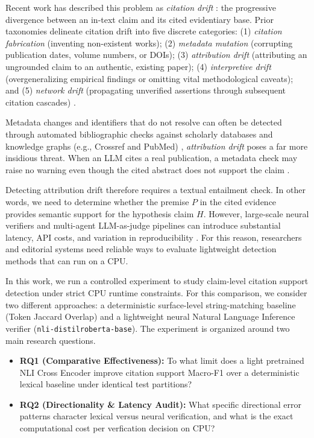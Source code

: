 \documentclass[11pt,a4paper]{article}
\begin{document}
Recent work has described this problem as \textit{citation drift} \cite{seetharam2025citation, agarwal2026citation}: the progressive divergence between an in-text claim and its cited evidentiary base. Prior taxonomies delineate citation drift into five discrete categories: (1) \textit{citation fabrication} (inventing non-existent works); (2) \textit{metadata mutation} (corrupting publication dates, volume numbers, or DOIs); (3) \textit{attribution drift} (attributing an ungrounded claim to an authentic, existing paper); (4) \textit{interpretive drift} (overgeneralizing empirical findings or omitting vital methodological caveats); and (5) \textit{network drift} (propagating unverified assertions through subsequent citation cascades) \cite{agarwal2026citation}.

Metadata changes and identifiers that do not resolve can often be detected through automated bibliographic checks against scholarly databases and knowledge graphs (e.g., Crossref and PubMed) \cite{wieczorek2026detecting}, \textit{attribution drift} poses a far more insidious threat. When an LLM cites a real publication, a metadata check may raise no warning even though the cited abstract does not support the claim \cite{gao2023enabling, zhu2025vericite}.

Detecting attribution drift therefore requires a textual entailment check. In other words, we need to determine whether the premise $P$ in the cited evidence provides semantic support for the hypothesis claim $H$. However, large-scale neural verifiers and multi-agent LLM-as-judge pipelines can introduce substantial latency, API costs, and variation in reproducibility \cite{kosprdic2024scientific}. For this reason, researchers and editorial systems need reliable ways to evaluate lightweight detection methods that can run on a CPU.

In this work, we run a controlled experiment to study claim-level citation support detection under strict CPU runtime constraints. For this comparison, we consider two different approaches: a deterministic surface-level string-matching baseline (Token Jaccard Overlap) and a lightweight neural Natural Language Inference verifier (\texttt{nli-distilroberta-base}). The experiment is organized around two main research questions.
\begin{itemize}
    \item \textbf{RQ1 (Comparative Effectiveness):} To what limit does a light pretrained NLI Cross Encoder improve citation support Macro-F1 over a deterministic lexical baseline under identical test partitions?
    \item \textbf{RQ2 (Directionality \& Latency Audit):} What specific directional error patterns character lexical versus neural verification, and what is the exact computational cost per verfication decision on CPU?
\end{itemize}
\end{document}
